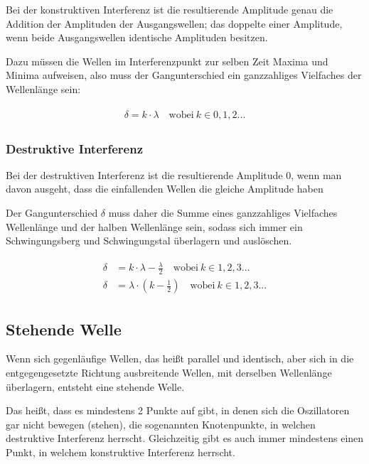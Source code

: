 	Bei der konstruktiven Interferenz ist die resultierende Amplitude genau die Addition der Amplituden der Ausgangswellen; das doppelte einer Amplitude, wenn beide Ausgangswellen identische Amplituden besitzen.
	
	Dazu müssen die Wellen im Interferenzpunkt zur selben Zeit Maxima und Minima aufweisen, also muss der Gangunterschied ein ganzzahliges Vielfaches der Wellenlänge sein:
	
	\begin{align}	\label{eq:kon_interferenz}
	\begin{split}
		\delta = k \cdot \lambda \quad \text{wobei} \ k \in 0,1,2...
	\end{split}
	\end{align}
	
	\subsubsection{Destruktive Interferenz}
	
	Bei der destruktiven Interferenz ist die resultierende Amplitude 0, wenn man davon ausgeht, dass die einfallenden Wellen die gleiche Amplitude haben
	
	Der Gangunterschied $\delta$ muss daher die Summe eines ganzzahliges Vielfaches Wellenlänge und der halben Wellenlänge sein, sodass sich immer ein Schwingungsberg und Schwingungstal überlagern und auslöschen.
	
	\begin{align}	\label{eq:des_interferenz}
	\begin{split}
		\delta &= k \cdot \lambda - \frac{\lambda}{2} \quad \text{wobei} \ k \in 1,2,3... \\
		\delta &= \lambda \cdot (k - \frac{1}{2}) \quad \text{wobei} \ k \in 1,2,3... 
	\end{split}
	\end{align}
	

\subsection{Stehende Welle}
	
Wenn sich gegenläufige Wellen, das heißt parallel und identisch, aber sich in die entgegengesetzte Richtung ausbreitende Wellen, mit derselben Wellenlänge überlagern, entsteht eine stehende Welle. 

Das heißt, dass es mindestens 2 Punkte auf gibt, in denen sich die Oszillatoren gar nicht bewegen (\glqq stehen\grqq), die sogenannten Knotenpunkte, in welchen destruktive Interferenz herrscht. Gleichzeitig gibt es auch immer mindestens einen Punkt, in welchem konstruktive Interferenz herrscht.
	
